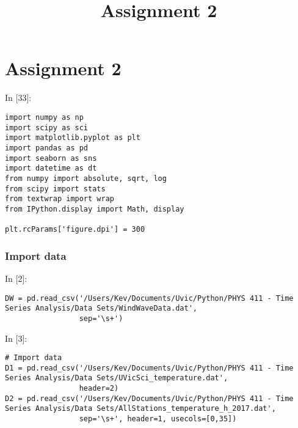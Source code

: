 \documentclass[11pt]{article}
\title{Assignment 2}
\newif\ifcode
\newif\ifleftmargins
\newlength{\promptlength}
\newcommand{\prompt}[3]{
        \needspace{1.1cm}
        \settowidth{\promptlength}{ #1 [#3] }
        \ifleftmargins\hspace{-\promptlength}\hspace{-5pt}\fi
        {\color{#2}#1 [#3]:}
        \ifleftmargins\vspace{-2.7ex}\fi
    }
\begin{document}
    
    
    
    
    

    
    \hypertarget{assignment-2}{%
\section{Assignment 2}\label{assignment-2}}

    
\prompt{In}{incolor}{33}
\codetrue
\begin{tcolorbox}[breakable, size=fbox, boxrule=1pt, pad at break*=1mm, colback=cellbackground, colframe=cellborder]
\begin{verbatim}
import numpy as np
import scipy as sci
import matplotlib.pyplot as plt
import pandas as pd 
import seaborn as sns 
import datetime as dt
from numpy import absolute, sqrt, log
from scipy import stats
from textwrap import wrap
from IPython.display import Math, display

plt.rcParams['figure.dpi'] = 300
\end{verbatim}
\end{tcolorbox}
\codefalse

    \hypertarget{import-data}{%
\subsubsection{Import data}\label{import-data}}

    
\prompt{In}{incolor}{2}
\codetrue
\begin{tcolorbox}[breakable, size=fbox, boxrule=1pt, pad at break*=1mm, colback=cellbackground, colframe=cellborder]
\begin{verbatim}
DW = pd.read_csv('/Users/Kev/Documents/Uvic/Python/PHYS 411 - Time Series Analysis/Data Sets/WindWaveData.dat', 
                 sep='\s+')
\end{verbatim}
\end{tcolorbox}
\codefalse

    
\prompt{In}{incolor}{3}
\codetrue
\begin{tcolorbox}[breakable, size=fbox, boxrule=1pt, pad at break*=1mm, colback=cellbackground, colframe=cellborder]
\begin{verbatim}
# Import data
D1 = pd.read_csv('/Users/Kev/Documents/Uvic/Python/PHYS 411 - Time Series Analysis/Data Sets/UVicSci_temperature.dat', 
                 header=2)
D2 = pd.read_csv('/Users/Kev/Documents/Uvic/Python/PHYS 411 - Time Series Analysis/Data Sets/AllStations_temperature_h_2017.dat', 
                 sep='\s+', header=1, usecols=[0,35])
\end{verbatim}
\end{tcolorbox}
\codefalse
\end{document}
